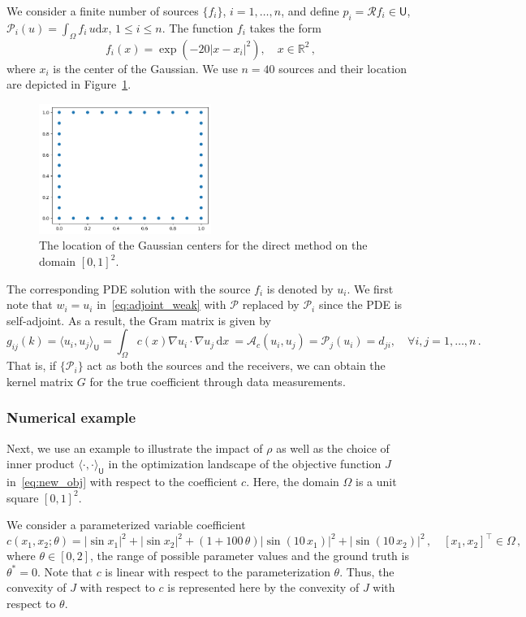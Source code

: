 \documentclass[12pt]{amsart}
\newcommand{\rd}{\mathrm{d}}
\begin{document}
We consider a finite number of sources $\{f_i\}$, $i=1,\ldots, n$, and define $p_i = \mathcal{R} f_i \in \mathsf{U}$, $\mathcal{P}_i(u) = \int_\Omega f_i \, u \rd x $, $1\leq i\leq n$. The function $f_i$ takes the form
\[
f_i(x) = \exp{(-20|x-x_i|^2)},\quad x\in \mathbb{R}^2\,,
\]
where $x_i$ is the center of the Gaussian. We use $n = 40$ sources and their location are depicted in Figure~\ref{fig:centers}.
\begin{figure}
\centering
\includegraphics[width = 0.5\textwidth]{figures/schrodinger_basis_loc.png}
    \caption{The location of the Gaussian centers for the direct method on the domain $[0,1]^2$.}\label{fig:centers}
\end{figure}
The corresponding PDE solution with the source $f_i$ is denoted by $u_i$. We first note that $w_i = u_i$ in~\eqref{eq:adjoint_weak} with $\mathcal{P}$ replaced by $\mathcal{P}_i$ since the PDE is self-adjoint. As a result, the Gram matrix is given by
\begin{equation}\label{eq:2d_poisson_kernel}
g_{ij}(k) = \langle u_i, u_j\rangle_{\mathsf{U}} = \int_\Omega c(x) \nabla u_i \cdot \nabla u_j  \,  \mathrm{d}x\ = \mathcal{A}_c(u_i,u_j) = \mathcal{P}_j(u_i) = d_{ji},\quad \forall i,j = 1,\ldots, n\,.
\end{equation}
That is, if $\{\mathcal{P}_i\}$ act as both the sources and the receivers, we can obtain the kernel matrix $G$ for the true coefficient through data measurements.

\subsubsection{Numerical example}
Next, we use an example to illustrate the impact of $\rho$ as well as the choice of inner product $\langle \cdot, \cdot \rangle_{\mathsf{U}}$ in the optimization landscape of the objective function $J$ in~\eqref{eq:new_obj} with respect to the coefficient $c$. Here, the domain $\Omega$ is a unit square $[0,1]^2$.

We consider a parameterized variable coefficient 
\[
c(x_1,x_2;\theta) = |\sin x_1|^2 + |\sin x_2|^2+ (1+100\,\theta)|\sin(10\,x_1)|^2 + |\sin(10\,x_2)|^2\,,\quad [x_1,x_2]^\top \in \Omega\,,
\]
where $\theta \in [0,2]$, the range of possible parameter values and the ground truth is $\theta^* = 0$. Note that $c$ is linear with respect to the parameterization $\theta$. Thus, the convexity of $J$ with respect to $c$ is represented here by the convexity of $J$ with respect to $\theta$.
\end{document}

